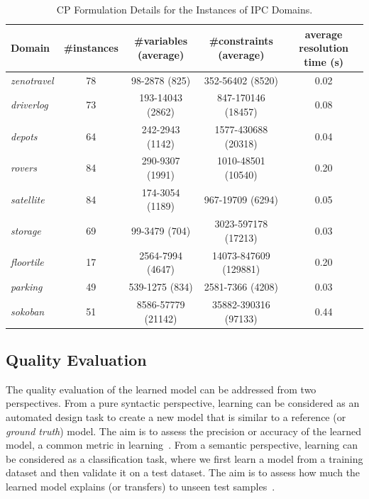 \documentclass[10pt,journal,compsoc]{IEEEtran}
\begin{document}
\begin{table}
	\caption{CP Formulation Details for the Instances of IPC Domains.}
	\label{table:formulationdetails}
	\begin{center}
		\small
		\begin{tabular}{p{1.3cm}cccc}
			Domain & \#instances & \#variables (average) & \#constraints (average) & average resolution time (s)   \\
			
			\hline
			
			\emph{zenotravel} & 78 & 98-2878 (825) & 352-56402 (8520) & 0.02 \\
			\emph{driverlog} & 73 & 193-14043 (2862) & 847-170146 (18457) & 0.08 \\
			\emph{depots} & 64 & 242-2943 (1142) & 1577-430688 (20318) & 0.04 \\
			\emph{rovers} & 84 & 290-9307 (1991) & 1010-48501 (10540) & 0.20 \\
			\emph{satellite} & 84 & 174-3054 (1189) & 967-19709 (6294) & 0.05 \\
			\emph{storage} & 69 & 99-3479 (704) & 3023-597178 (17213) & 0.03 \\
			\emph{floortile} & 17 & 2564-7994 (4647) & 14073-847609 (129881) & 0.20 \\			
			\emph{parking} & 49 & 539-1275 (834) & 2581-7366 (4208) & 0.03 \\
			\emph{sokoban} & 51 & 8586-57779 (21142) & 35882-390316 (97133) & 0.44 \\
			
			\hline
		\end{tabular}
		\normalsize
	\end{center}
\end{table}



\subsection{Quality Evaluation}

The quality evaluation of the learned model can be addressed from two perspectives. From a pure syntactic perspective, learning can be considered as an automated design task to create a new model that is similar to a reference (or {\em ground truth}) model. The aim is to assess the precision or accuracy of the learned model, a common metric in learning~\cite{aineto2018icaps,Zhuo2014,ZhuoYHL10}.
From a semantic perspective, learning can be considered as a classification task, where we first learn a model from a training dataset and then validate it on a test dataset. The aim is to assess how much the learned model explains (or transfers) to unseen test samples~\cite{Aggarwal2016,Jialin2010,ZhuoQ14}.
\end{document}
